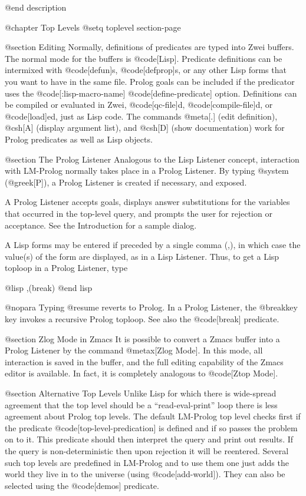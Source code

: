 {@end description

@chapter Top Levels
@setq toplevel section-page

@section Editing
Normally, definitions of predicates are typed into Zwei buffers.
The normal mode for the buffers is @code[Lisp].
Predicate definitions can be intermixed with @code[defun]s, @code[defprop]s, 
or any other Lisp forms that you want to have in the same file.  
Prolog goals can be included if the predicator uses the
@code[:lisp-macro-name] @code[define-predicate] option.
Definitions can be compiled or evaluated in Zwei, 
@code[qc-file]d, @code[compile-file]d, or @code[load]ed, just as Lisp code.
The commands @meta[.] (edit definition),
@csh[A] (display argument list), and @csh[D] (show documentation) 
work for Prolog predicates as well as Lisp objects.

@section The Prolog Listener
Analogous to the Lisp Listener concept, interaction with LM-Prolog
normally takes place in a Prolog Listener.  By typing @system  (@greek[P]),
a Prolog Listener is created if necessary, and exposed.

A Prolog Listener accepts goals, displays answer substitutions
for the variables that occurred in the top-level query, and prompts the
user for rejection or acceptance.  See the Introduction for a sample dialog.

A Lisp forms may be entered if preceded by a single comma (,),
in which case the value(s) of the form are displayed, as in a Lisp Listener.
Thus, to get a Lisp toploop in a Prolog Listener, type

@lisp
,(break)
@end lisp

@nopara
Typing @resume reverts to Prolog.  In a Prolog Listener,
the @breakkey key invokes a recursive Prolog toploop.  See also the
@code[break] predicate.

@section Zlog Mode in Zmacs
It is possible to convert a Zmacs buffer into a Prolog Listener
by the command @metax[Zlog Mode].  In this mode, all interaction is saved
in the buffer, and the full editing capability of the Zmacs editor is
available.  In fact, it is completely analogous to @code[Ztop Mode].

@section Alternative Top Levels
Unlike Lisp for which there is wide-spread agreement that the top level should
be a ``read-eval-print'' loop there is less agreement about Prolog top levels.
The default LM-Prolog top level checks first if the predicate
@code[top-level-predication] is defined and if so passes the problem on to it.
This predicate should then interpret the query and print out results.
If the query is non-deterministic then upon rejection it will be reentered.
Several such top levels are predefined in LM-Prolog and to use them one just
adds the world they live in to the universe (using @code[add-world]).
They can also be selected using the @code[demos] predicate.

}
